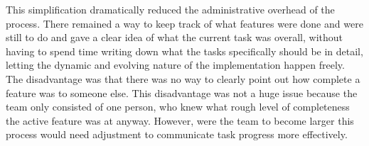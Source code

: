 This simplification dramatically reduced the administrative overhead of the process. There remained a way to keep track of what features were done and were still to do and gave a clear idea of what the current task was overall, without having to spend time writing down what the tasks specifically should be in detail, letting the dynamic and evolving nature of the implementation happen freely. The disadvantage was that there was no way to clearly point out how complete a feature was to someone else. This disadvantage was not a huge issue because the team only consisted of one person, who knew what rough level of completeness the active feature was at anyway. However, were the team to become larger this process would need adjustment to communicate task progress more effectively.

